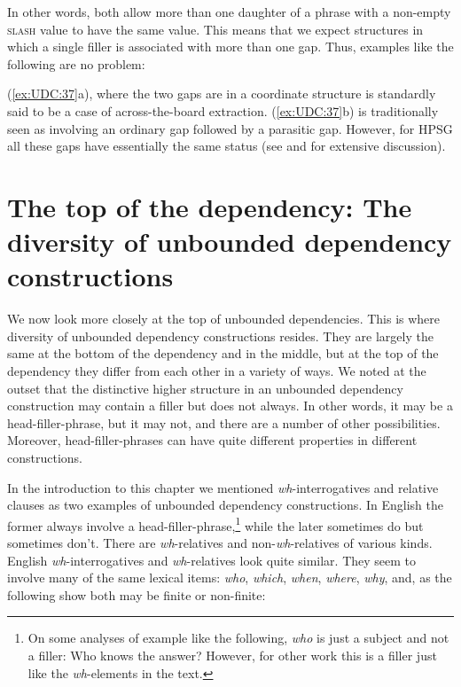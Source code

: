 \documentclass[output=paper
                ,modfonts
                ,nonflat
	        ,collection
	        ,collectionchapter
	        ,collectiontoclongg
 	        ,biblatex
                ,babelshorthands
                ,newtxmath
                ,draftmode
                ,colorlinks, citecolor=brown
]{./langsci/langscibook}
\begin{document}
{\noindent
In other words, both allow more than one daughter of a phrase with a
non-empty \textsc{slash} value to have the same value. This means that we expect
structures in which a single filler is associated with more than one
gap. Thus, examples like the following are no problem:

\begin{exe} \ex \begin{xlist} \label{ex:UDC:37}

\end{xlist}
\end{exe}

\noindent
(\ref{ex:UDC:37}a), where the two gaps are in a coordinate structure
is standardly said to be a case of across-the-board
extraction. (\ref{ex:UDC:37}b) is traditionally seen as involving an
ordinary gap followed by a parasitic gap. However, for HPSG all these
gaps have essentially the same status (see \citealt{Levine:Hukari:06}
and \citealt{Chaves:12} for extensive discussion).

\section{The top of the dependency: The diversity of unbounded
dependency constructions}
\label{sec:UDC:Top}

We now look more closely at the top of unbounded dependencies. This is
where diversity of unbounded dependency constructions resides. They are
largely the same at the bottom of the dependency and in the middle, but
at the top of the dependency they differ from each other in a variety of
ways. We noted at the outset that the distinctive higher structure in an
unbounded dependency construction may contain a filler but does not
always. In other words, it may be a head-filler-phrase, but it may not,
and there are a number of other possibilities. Moreover,
head-filler-phrases can have quite different properties in different
constructions.

In the introduction to this chapter we mentioned
\emph{wh}-interrogatives and relative clauses as two examples of
unbounded dependency constructions. In English the former always involve
a head-filler-phrase,\footnote{On some analyses of example like the
  following, \emph{who} is just a subject and not a filler:
\ea
Who knows the answer?
\z
However, for other work this is a filler just like the
  \emph{wh}-elements in the text.} while the later sometimes do but
sometimes don't. There are \emph{wh}-relatives and
non-\emph{wh}-relatives of various kinds. English
\emph{wh}-interrogatives and \emph{wh}-relatives look quite similar.
They seem to involve many of the same lexical items: \emph{who},
\emph{which}, \emph{when}, \emph{where}, \emph{why}, and, as the
following show both may be finite or non-finite:

}
\end{document}
